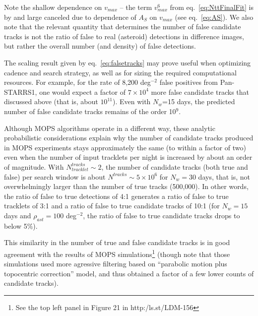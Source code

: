 Note the shallow dependence on $v_{max}$ -- the term $v_{max}^6$
from eq.~\ref{eq:NttFinalFit} is by and large canceled due to dependence of $A_S$ on 
$v_{max}$ (see eq.~\ref{eq:AS}). We also note that the relevant quantity that determines
the number of false candidate tracks is not the ratio of false to real (asteroid) detections 
in difference images, but rather the overall number (and density) of false detections. 

The scaling result given by eq.~\ref{eq:falsetracks} may prove useful when optimizing cadence 
and search strategy, as well as for sizing the required computational resources. For example, 
for the rate of 8,200 deg$^{-2}$ false positives from Pan-STARRS1, one would expect a factor 
of $7\times10^4$ more false candidate tracks that discussed above (that is, about $10^{11}$). 
Even with $N_w$=15 days, the predicted number of false candidate tracks remains of the 
order 10$^9$. 

Although MOPS algorithms operate in a different way, these analytic probabilistic considerations 
explain why the number of candidate tracks produced in MOPS experiments stays approximately
the same (to within a factor of two) even when the number of input tracklets per night is increased
by about an order of magnitude. With $N_{tracklet}^{tracks} \sim2$, the number of  candidate 
tracks (both true and false) per search window is about $N^{tracks} \sim 5\times10^6$ for $N_w= 30$ days,
that is, not overwhelmingly larger than the number of true tracks (500,000). In other words, the ratio of
false to true detections of 4:1 generates a ratio of false to true tracklets of 3:1 and a ratio of false to true
candidate tracks of 10:1 (for $N_w=15$ days and $\rho_{ast}=100$ deg$^{-2}$, the ratio of false to true 
candidate tracks drops to below 5\%). 

This similarity in the number of true and false candidate tracks is in good 
agreement with the results of MOPS simulations\footnote{See the top left panel 
in Figure 21 in http:/ls.st/LDM-156} (though note that those simulations used more agressive filtering
based on ``parabolic motion plus topocentric correction'' model, and thus obtained a factor of a few
lower counts of candidate tracks). 

